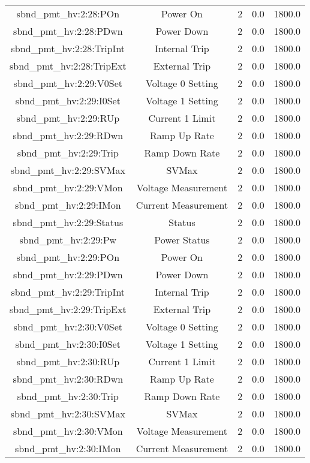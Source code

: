 \begin{center}
\begin{longtable}{c | c c c c }
sbnd\_pmt\_hv:2:28:POn & Power On & 2 & 0.0 & 1800.0\\ 
sbnd\_pmt\_hv:2:28:PDwn & Power Down & 2 & 0.0 & 1800.0\\ 
sbnd\_pmt\_hv:2:28:TripInt & Internal Trip & 2 & 0.0 & 1800.0\\ 
sbnd\_pmt\_hv:2:28:TripExt & External Trip & 2 & 0.0 & 1800.0\\ 
sbnd\_pmt\_hv:2:29:V0Set & Voltage 0 Setting & 2 & 0.0 & 1800.0\\ 
sbnd\_pmt\_hv:2:29:I0Set & Voltage 1 Setting & 2 & 0.0 & 1800.0\\ 
sbnd\_pmt\_hv:2:29:RUp & Current 1 Limit & 2 & 0.0 & 1800.0\\ 
sbnd\_pmt\_hv:2:29:RDwn & Ramp Up Rate & 2 & 0.0 & 1800.0\\ 
sbnd\_pmt\_hv:2:29:Trip & Ramp Down Rate & 2 & 0.0 & 1800.0\\ 
sbnd\_pmt\_hv:2:29:SVMax & SVMax & 2 & 0.0 & 1800.0\\ 
sbnd\_pmt\_hv:2:29:VMon & Voltage Measurement & 2 & 0.0 & 1800.0\\ 
sbnd\_pmt\_hv:2:29:IMon & Current Measurement & 2 & 0.0 & 1800.0\\ 
sbnd\_pmt\_hv:2:29:Status & Status & 2 & 0.0 & 1800.0\\ 
sbnd\_pmt\_hv:2:29:Pw & Power Status & 2 & 0.0 & 1800.0\\ 
sbnd\_pmt\_hv:2:29:POn & Power On & 2 & 0.0 & 1800.0\\ 
sbnd\_pmt\_hv:2:29:PDwn & Power Down & 2 & 0.0 & 1800.0\\ 
sbnd\_pmt\_hv:2:29:TripInt & Internal Trip & 2 & 0.0 & 1800.0\\ 
sbnd\_pmt\_hv:2:29:TripExt & External Trip & 2 & 0.0 & 1800.0\\ 
sbnd\_pmt\_hv:2:30:V0Set & Voltage 0 Setting & 2 & 0.0 & 1800.0\\ 
sbnd\_pmt\_hv:2:30:I0Set & Voltage 1 Setting & 2 & 0.0 & 1800.0\\ 
sbnd\_pmt\_hv:2:30:RUp & Current 1 Limit & 2 & 0.0 & 1800.0\\ 
sbnd\_pmt\_hv:2:30:RDwn & Ramp Up Rate & 2 & 0.0 & 1800.0\\ 
sbnd\_pmt\_hv:2:30:Trip & Ramp Down Rate & 2 & 0.0 & 1800.0\\ 
sbnd\_pmt\_hv:2:30:SVMax & SVMax & 2 & 0.0 & 1800.0\\ 
sbnd\_pmt\_hv:2:30:VMon & Voltage Measurement & 2 & 0.0 & 1800.0\\ 
sbnd\_pmt\_hv:2:30:IMon & Current Measurement & 2 & 0.0 & 1800.0\\ 

\end{longtable}
\end{center}
